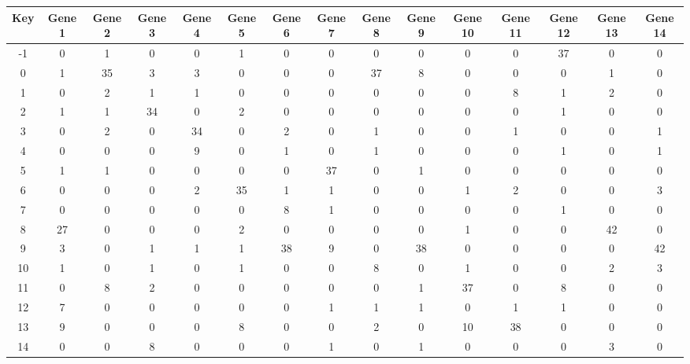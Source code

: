 \begin{tabular}{|c|c|c|c|c|c|c|c|c|c|c|c|c|c|c|}
\hline
Key & Gene 1 & Gene 2 & Gene 3 & Gene 4 & Gene 5 & Gene 6 & Gene 7 & Gene 8 & Gene 9 & Gene 10 & Gene 11 & Gene 12 & Gene 13 & Gene 14 \\
\hline
-1 & 0 & 1 & 0 & 0 & 1 & 0 & 0 & 0 & 0 & 0 & 0 & 37 & 0 & 0 \\
0 & 1 & 35 & 3 & 3 & 0 & 0 & 0 & 37 & 8 & 0 & 0 & 0 & 1 & 0 \\
1 & 0 & 2 & 1 & 1 & 0 & 0 & 0 & 0 & 0 & 0 & 8 & 1 & 2 & 0 \\
2 & 1 & 1 & 34 & 0 & 2 & 0 & 0 & 0 & 0 & 0 & 0 & 1 & 0 & 0 \\
3 & 0 & 2 & 0 & 34 & 0 & 2 & 0 & 1 & 0 & 0 & 1 & 0 & 0 & 1 \\
4 & 0 & 0 & 0 & 9 & 0 & 1 & 0 & 1 & 0 & 0 & 0 & 1 & 0 & 1 \\
5 & 1 & 1 & 0 & 0 & 0 & 0 & 37 & 0 & 1 & 0 & 0 & 0 & 0 & 0 \\
6 & 0 & 0 & 0 & 2 & 35 & 1 & 1 & 0 & 0 & 1 & 2 & 0 & 0 & 3 \\
7 & 0 & 0 & 0 & 0 & 0 & 8 & 1 & 0 & 0 & 0 & 0 & 1 & 0 & 0 \\
8 & 27 & 0 & 0 & 0 & 2 & 0 & 0 & 0 & 0 & 1 & 0 & 0 & 42 & 0 \\
9 & 3 & 0 & 1 & 1 & 1 & 38 & 9 & 0 & 38 & 0 & 0 & 0 & 0 & 42 \\
10 & 1 & 0 & 1 & 0 & 1 & 0 & 0 & 8 & 0 & 1 & 0 & 0 & 2 & 3 \\
11 & 0 & 8 & 2 & 0 & 0 & 0 & 0 & 0 & 1 & 37 & 0 & 8 & 0 & 0 \\
12 & 7 & 0 & 0 & 0 & 0 & 0 & 1 & 1 & 1 & 0 & 1 & 1 & 0 & 0 \\
13 & 9 & 0 & 0 & 0 & 8 & 0 & 0 & 2 & 0 & 10 & 38 & 0 & 0 & 0 \\
14 & 0 & 0 & 8 & 0 & 0 & 0 & 1 & 0 & 1 & 0 & 0 & 0 & 3 & 0 \\
\hline
\end{tabular}